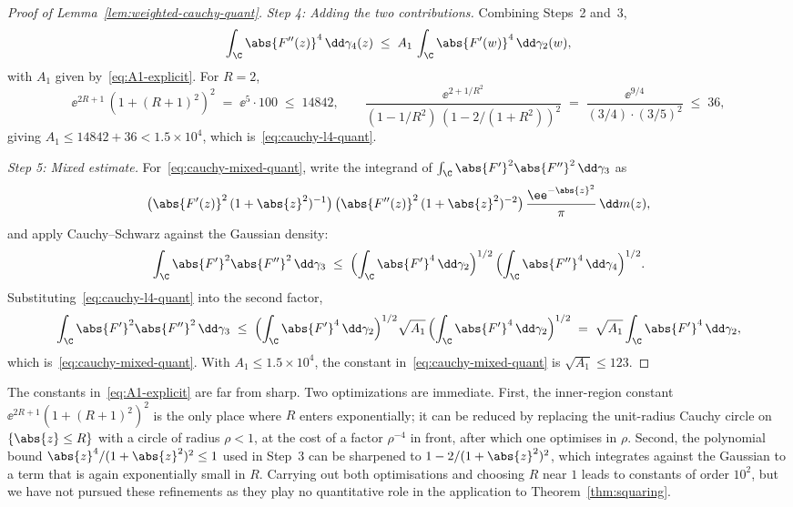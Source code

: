 \begin{proof}[Proof of Lemma~\ref{lem:weighted-cauchy-quant}]
\medskip
\noindent\emph{Step 4: Adding the two contributions.}\;
Combining Steps~2 and~3,
\[
\int_{\C}\abs{F''(z)}^{4}\,\dd\gamma_{4}(z)
\;\le\;
A_{1}\,\int_{\C}\abs{F'(w)}^{4}\,\dd\gamma_{2}(w),
\]
with $A_{1}$ given by~\eqref{eq:A1-explicit}. For $R = 2$,
\[
\ee^{2R+1}\,(1+(R+1)^{2})^{2}
\;=\; \ee^{5}\cdot 100 \;\le\; 14842,
\qquad
\frac{\ee^{2+1/R^{2}}}{(1-1/R^{2})\,(1-2/(1+R^{2}))^{2}}
\;=\;
\frac{\ee^{9/4}}{(3/4)\cdot(3/5)^{2}}
\;\le\; 36,
\]
giving $A_{1}\le 14842 + 36 < 1.5\times 10^{4}$, which
is~\eqref{eq:cauchy-l4-quant}.

\medskip
\noindent\emph{Step 5: Mixed estimate.}\;
For~\eqref{eq:cauchy-mixed-quant}, write the integrand of
$\int_{\C}\abs{F'}^{2}\abs{F''}^{2}\,\dd\gamma_{3}$ as
\[
\bigl(\abs{F'(z)}^{2}\,(1+\abs{z}^{2})^{-1}\bigr)\,
\bigl(\abs{F''(z)}^{2}\,(1+\abs{z}^{2})^{-2}\bigr)\,
\frac{\ee^{-\abs{z}^{2}}}{\pi}\,\dd m(z),
\]
and apply Cauchy--Schwarz against the Gaussian density:
\[
\int_{\C}\abs{F'}^{2}\abs{F''}^{2}\,\dd\gamma_{3}
\;\le\;
\Bigl(\int_{\C}\abs{F'}^{4}\,\dd\gamma_{2}\Bigr)^{1/2}\,
\Bigl(\int_{\C}\abs{F''}^{4}\,\dd\gamma_{4}\Bigr)^{1/2}.
\]
Substituting~\eqref{eq:cauchy-l4-quant} into the second factor,
\[
\int_{\C}\abs{F'}^{2}\abs{F''}^{2}\,\dd\gamma_{3}
\;\le\;
\Bigl(\int_{\C}\abs{F'}^{4}\,\dd\gamma_{2}\Bigr)^{1/2}
\sqrt{A_{1}}\,\Bigl(\int_{\C}\abs{F'}^{4}\,\dd\gamma_{2}\Bigr)^{1/2}
\;=\;
\sqrt{A_{1}}\int_{\C}\abs{F'}^{4}\,\dd\gamma_{2},
\]
which is~\eqref{eq:cauchy-mixed-quant}. With $A_{1}\le 1.5\times
10^{4}$, the constant in~\eqref{eq:cauchy-mixed-quant} is
$\sqrt{A_{1}}\le 123$.
\end{proof}

\begin{remark}\label{rem:cauchy-sharper}
The constants in~\eqref{eq:A1-explicit} are far from sharp. Two
optimizations are immediate. First, the inner-region constant
$\ee^{2R+1}(1+(R+1)^{2})^{2}$ is the only place where $R$ enters
exponentially; it can be reduced by replacing the unit-radius Cauchy
circle on $\{\abs{z}\le R\}$ with a circle of radius $\rho < 1$, at the
cost of a factor $\rho^{-4}$ in front, after which one optimises in
$\rho$.  Second, the polynomial bound
$\abs{z}^{4}/(1+\abs{z}^{2})^{2}\le 1$ used in Step~3 can be sharpened
to $1 - 2/(1+\abs{z}^{2})^{2}$, which integrates against the Gaussian
to a term that is again exponentially small in $R$. Carrying out both
optimisations and choosing $R$ near $1$ leads to constants of order
$10^{2}$, but we have not pursued these refinements as they play no
quantitative role in the application to Theorem~\ref{thm:squaring}.
\end{remark}

